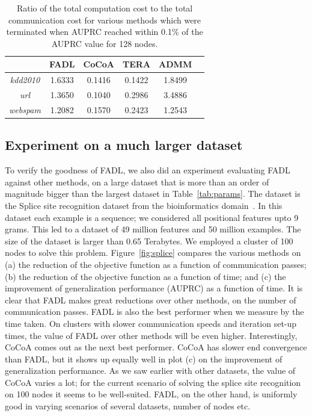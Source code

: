 \documentclass[twoside, 11pt]{article}
\begin{document}
\begin{table}[ht]
\centering %
\begin{tabular}{|c|c|c|c|c|c} %
\hline %
& FADL & CoCoA & TERA & ADMM  \\
\hline
{\it kdd2010} & 1.6333 &   0.1416  &   0.1422  &  1.8499\\
\hline
{\it url} & 1.3650 &   0.1040  &  0.2986 &    3.4886\\
\hline
{\it webspam} & 1.2082 &   0.1570  &  0.2423 &    1.2543\\
\hline
\end{tabular}
\caption{Ratio of the total computation cost to the total communication cost for various methods which were terminated when AUPRC reached within 0.1\% of the AUPRC value for 128 nodes.} %
\label{tab:compcommcost}
\end{table}

\subsection{Experiment on a much larger dataset}
\label{subsec:splice}

To verify the goodness of FADL, we also did an experiment evaluating FADL against other methods, on a large dataset that is more than an order of magnitude bigger than the largest dataset in Table~\ref{tab:params}. The dataset is the Splice site recognition dataset from the bioinformatics domain~\citep{sonnenburg2010}. In this dataset each example is a sequence; we considered all positional features upto 9 grams. This led to a dataset of 49 million features and 50 million examples. The size of the dataset is larger than 0.65 Terabytes. We employed a cluster of 100 nodes to solve this problem. Figure~\ref{fig:splice} compares the various methods on (a) the reduction of the objective function as a function of communication passes; (b) the reduction of the objective function as a function of time; and (c) the improvement of generalization performance (AUPRC) as a function of time. It is clear that FADL makes great reductions over other methods, on the number of communication passes. FADL is also the best performer when we measure by the time taken. On clusters with slower communication speeds and iteration set-up times, the value of FADL over other methods will be even higher. Interestingly, CoCoA comes out as the next best performer. CoCoA has slower end convergence than FADL, but it shows up equally well in plot (c) on the improvement of generalization performance. As we saw earlier with other datasets, the value of CoCoA varies a lot; for the current scenario of solving the splice site recognition on 100 nodes it seems to be well-suited. FADL, on the other hand, is uniformly good in varying scenarios of several datasets, number of nodes etc.
\end{document}
